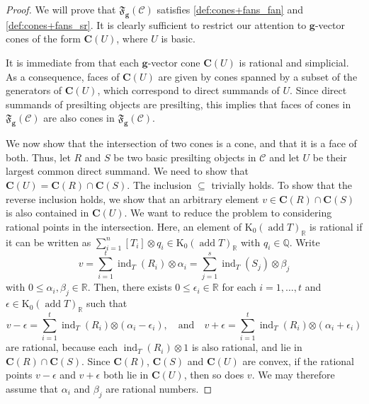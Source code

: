 \documentclass[10pt,twoside, a4paper,reqno]{amsart}
\DeclareMathOperator{\add}{add}
\DeclareMathOperator{\ind}{ind}
\newcommand{\partfan}[1]{\mathfrak{F}_{\bfg}(#1)}
\newcommand{\R}{\mathbb{R}}
\newcommand{\calC}{\mathcal{C}}
\newcommand{\boldC}{\mathbf{C}}
\newcommand{\K}{\mathrm{K}}
\newcommand{\bfg}{\mathbf{g}}
\theoremstyle{definition}
\begin{document}
\begin{proof}
    We will prove that $\partfan{\calC}$ satisfies \eqref{def:cones+fans_fan} and \eqref{def:cones+fans_sr}. It is clearly sufficient to restrict our attention to $\bfg$-vector cones of the form $\boldC(U)$, where $U$ is basic.
    
    It is immediate from  that each $\bfg$-vector cone $\boldC(U)$ is rational and simplicial. As a consequence, faces of $\boldC(U)$ are given by cones spanned by a subset of the generators of $\boldC(U)$, which correspond {to} direct summands of $U$. {Since direct summands of presilting objects are presilting, this implies} that faces of cones in $\partfan{\calC}$ are also cones in $\partfan{\calC}$.

    We now show that the intersection of two cones is a cone, and that it is a face of both. Thus, let $R$ and $S$ be two basic presilting objects in $\calC$ and let $U$ be their largest common direct summand. We need to show that $\boldC(U)= \boldC({R}) \cap \boldC({S})$. The inclusion $\subseteq$ trivially holds. To show that the reverse inclusion holds, we show that an arbitrary element $v \in \boldC({R}) \cap \boldC({S})$ is also contained in $\boldC(U)$. 
    We want to reduce the problem to considering rational points in the intersection. Here, an element of $\K_0(\add T)_\R$ is rational if it can be written as $\sum_{i=1}^n [T_i] \otimes q_i \in \K_0(\add T)_\R$ with $q_i \in \mathbb{Q}$. Write 
    \[ v = \sum_{i=1}^t  \ind_T({R_i}) \otimes \alpha_i = \sum_{j=1}^{s} \ind_T({S_j}) \otimes \beta_j \]
    with $0 \leq \alpha_i, \beta_j \in \R$. Then, there exists $0 \leq \epsilon_i \in \R$ for each $i=1, \dots, t$ and ${\epsilon} \in \K_0(\add T)_\R$ such that 
    \[ v - {\epsilon} =  \sum_{i=1}^t  \ind_T({R_i}) {\otimes (\alpha_i-\epsilon_i)}, \quad \text{and} \quad v + {\epsilon} =  \sum_{i=1}^t \ind_T({R_i}) {\otimes (\alpha_i+\epsilon_i)} \]
    are rational, because each $\ind_T(R_i) \otimes 1$ is also rational, and lie in $\boldC(R) \cap \boldC(S)$. Since $\boldC(R)$, $\boldC(S)$ and $\boldC(U)$ are convex, if the rational points $v-\epsilon$ and $v + \epsilon$ both lie in $\boldC(U)$, then so does $v$. We may therefore assume that $\alpha_i$ and $\beta_j$ are rational numbers.
    

\end{proof}
\end{document}
